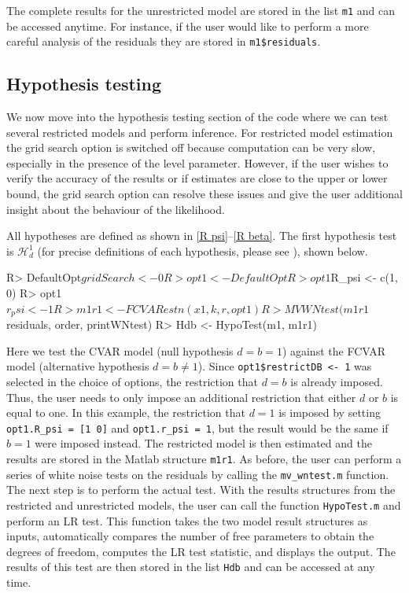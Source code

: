 \documentclass[article]{jss}
\begin{document}
The complete results for the unrestricted model are stored in the list \verb|m1| and can be accessed anytime. For instance, if the user would like to perform a more careful analysis of the residuals they are stored in \verb|m1$residuals|.

\subsection{Hypothesis testing}
\label{subsec hypo}

We now move into the hypothesis testing section of the code where we can test several restricted models and perform inference. For restricted model estimation the grid search option is switched off because computation can be very slow, especially in the presence of the level parameter. However, if the user wishes to verify the accuracy of the results or if estimates are close to the upper or lower bound, the grid search option can resolve these issues and give the user additional insight about the behaviour of the likelihood.

All hypotheses are defined as shown in \eqref{R psi}--\eqref{R beta}. The first hypothesis test is $\mathscr{H}_d^1$ (for precise definitions of each hypothesis, please see \cite{JNP2014}), 
shown below. 

\begin{Code}
R> DefaultOpt$gridSearch <- 0
R> opt1 <- DefaultOpt
R> opt1$R_psi <- c(1, 0)
R> opt1$r_psi <- 1
R> m1r1 <- FCVARestn(x1, k, r, opt1)
R> MVWNtest(m1r1$residuals, order, printWNtest)
R> Hdb <- HypoTest(m1, m1r1)
\end{Code}

Here we test the CVAR model (null hypothesis $d=b=1$) against the FCVAR model (alternative hypothesis $d=b\ne 1$). Since \verb|opt1$restrictDB <- 1| was selected in the choice of options,
the restriction that $d=b$ is already imposed. Thus, the user needs to only impose an additional restriction that either $d$ or $b$ is equal to one. In this example, the restriction that $d=1$ is imposed by setting \verb|opt1.R_psi = [1 0]| and \verb|opt1.r_psi = 1|, but the result would be the same if $b=1$ were imposed instead. The restricted model is then estimated and the results are stored in the Matlab structure \verb|m1r1|. As before, the user can perform a series of white noise tests on the residuals by calling the \verb|mv_wntest.m| function. The next step is to perform the actual test. With the results structures from the restricted and unrestricted models, the user can call the function \verb|HypoTest.m| and perform an LR test. This function takes the two model result structures as inputs, automatically compares the number of free parameters to obtain the degrees of freedom, computes the LR test statistic, and displays the output. The results of this test are then stored in the list \verb|Hdb| and can be accessed at any time.
\end{document}

